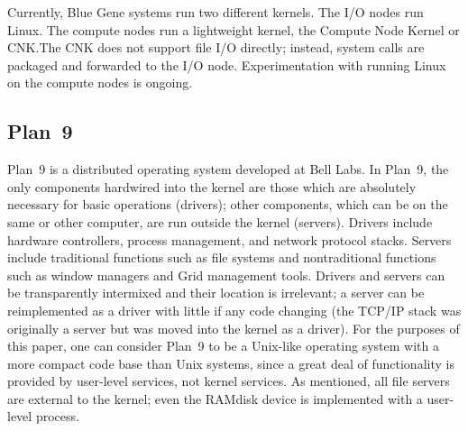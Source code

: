 \documentclass[letterpaper,twocolumn,10pt]{article}
\begin{document}
Currently, Blue Gene systems run two different kernels. The I/O nodes run Linux. The compute nodes run a lightweight kernel, the Compute Node Kernel or CNK.The CNK does not support file I/O directly; instead, system calls are packaged and forwarded to the I/O node. Experimentation with running Linux on the compute nodes is ongoing. 

\subsection{Plan~9}
Plan~9\cite{Plan9} is a distributed operating system developed at Bell Labs. In Plan~9, the only components hardwired into the kernel are those which are absolutely necessary for basic operations (drivers); other components, which can be on the same or other computer, are run outside the kernel (servers). Drivers include hardware controllers, process management, and network protocol stacks. Servers include traditional functions such as file systems and nontraditional functions such as window managers and Grid management tools. Drivers and servers can be transparently intermixed and their location is irrelevant; a server can be reimplemented as a driver with little if any code changing (the TCP/IP stack was originally a server but was moved into the kernel as a driver). For the purposes of this paper, one can consider Plan~9 to be a Unix-like operating 
system with a more compact code base than Unix systems, since a great deal of functionality is provided by user-level services, not kernel services. As mentioned, all file servers are external to the kernel; even the 
RAMdisk 
device is implemented with a user-level process. 
\end{document}
